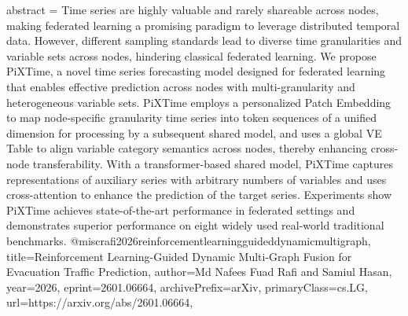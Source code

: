 {      abstract = {Time series are highly valuable and rarely shareable across nodes, making federated learning a promising paradigm to leverage distributed temporal data. However, different sampling standards lead to diverse time granularities and variable sets across nodes, hindering classical federated learning. We propose PiXTime, a novel time series forecasting model designed for federated learning that enables effective prediction across nodes with multi-granularity and heterogeneous variable sets. PiXTime employs a personalized Patch Embedding to map node-specific granularity time series into token sequences of a unified dimension for processing by a subsequent shared model, and uses a global VE Table to align variable category semantics across nodes, thereby enhancing cross-node transferability. With a transformer-based shared model, PiXTime captures representations of auxiliary series with arbitrary numbers of variables and uses cross-attention to enhance the prediction of the target series. Experiments show PiXTime achieves state-of-the-art performance in federated settings and demonstrates superior performance on eight widely used real-world traditional benchmarks.}
}@misc{rafi2026reinforcementlearningguideddynamicmultigraph,
      title={Reinforcement Learning-Guided Dynamic Multi-Graph Fusion for Evacuation Traffic Prediction}, 
      author={Md Nafees Fuad Rafi and Samiul Hasan},
      year={2026},
      eprint={2601.06664},
      archivePrefix={arXiv},
      primaryClass={cs.LG},
      url={https://arxiv.org/abs/2601.06664},
}
